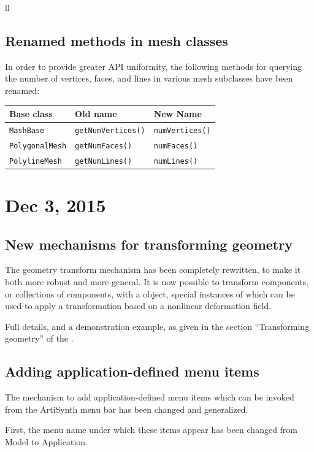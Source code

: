 \documentclass{article}
\begin{document}
\begin{tabular}{ll}
\subsection*{Renamed methods in mesh classes}

In order to provide greater API uniformity, the following methods for
querying the number of vertices, faces, and lines in various mesh
subclasses have been renamed:

\begin{tabular}{lll}
Base class & Old name & New Name \\
\hline
{\tt MashBase} & {\tt getNumVertices()} & {\tt numVertices()}\\
{\tt PolygonalMesh} & {\tt getNumFaces()} & {\tt numFaces()}\\
{\tt PolylineMesh} & {\tt getNumLines()} & {\tt numLines()}\\
\end{tabular}

\section*{Dec 3, 2015}

\subsection*{New mechanisms for transforming geometry}

The geometry transform mechanism has been completely rewritten, to
make it both more robust and more general. It is now possible to
transform components, or collections of components, with a
 object, special
instances of which can be used to apply a transformation based on a
nonlinear deformation field.

Full details, and a demonstration example, as given in the section
``Transforming geometry'' of the
.

\subsection*{Adding application-defined menu items}

The mechanism to add application-defined menu items which can be
invoked from the ArtiSynth menu bar has been changed and
generalized. 

First, the menu name under which these items appear has been changed from {\sf
Model} to {\sf Application}.


\end{tabular}
\end{document}
